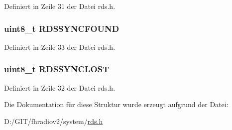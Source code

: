 Definiert in Zeile 31 der Datei rds.\+h.

\hypertarget{structinfo_a924e0044d60c0d490d165ceb3ef6b23d}{}
\subsubsection[{R\+D\+S\+S\+Y\+N\+C\+F\+O\+U\+N\+D}]{\setlength{\rightskip}{0pt plus 5cm}uint8\+\_\+t R\+D\+S\+S\+Y\+N\+C\+F\+O\+U\+N\+D}\label{structinfo_a924e0044d60c0d490d165ceb3ef6b23d}


Definiert in Zeile 33 der Datei rds.\+h.

\hypertarget{structinfo_a73c3d34273c45dd08fcb341496c08052}{}
\subsubsection[{R\+D\+S\+S\+Y\+N\+C\+L\+O\+S\+T}]{\setlength{\rightskip}{0pt plus 5cm}uint8\+\_\+t R\+D\+S\+S\+Y\+N\+C\+L\+O\+S\+T}\label{structinfo_a73c3d34273c45dd08fcb341496c08052}


Definiert in Zeile 32 der Datei rds.\+h.



Die Dokumentation für diese Struktur wurde erzeugt aufgrund der Datei\+:\begin{DoxyCompactItemize}
\item 
D\+:/\+G\+I\+T/fhradiov2/system/\hyperlink{rds_8h}{rds.\+h}\end{DoxyCompactItemize}
